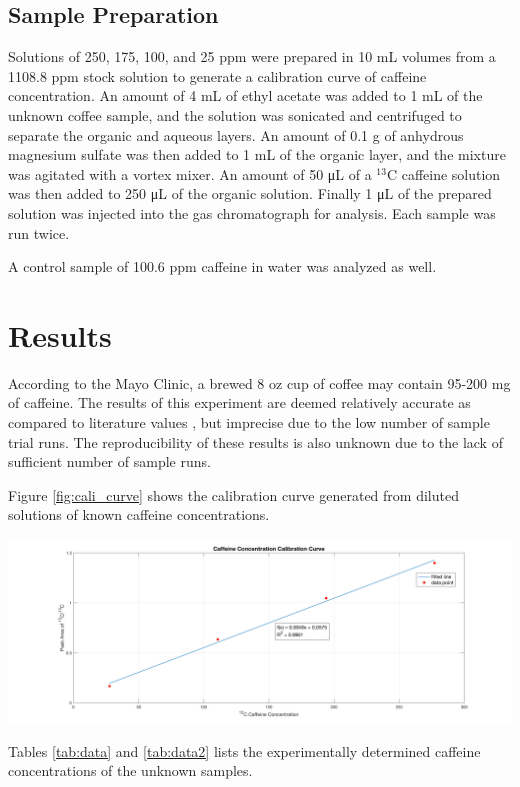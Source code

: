 \documentclass{article}
\begin{document}
\begin{multicols}{2}
{\subsection*{Sample Preparation}
Solutions of 250, 175, 100, and 25 ppm were prepared in 10 mL volumes
from a 1108.8 ppm stock solution to generate a calibration curve of caffeine
concentration. 
An amount of 4 mL of ethyl acetate was added to 1 mL of the unknown coffee
sample, and the solution was sonicated and centrifuged to separate the organic 
and aqueous layers.  
An amount of 0.1 g of anhydrous magnesium sulfate was then added to 1 mL of the
organic layer, and the mixture was agitated with a vortex mixer.  An amount of
50 μL of a $^{13}$C caffeine solution was then added to 250 μL of the organic
solution. 
Finally 1 μL of the prepared solution was injected into the gas chromatograph
for analysis. Each sample was run twice.

A control sample of 100.6 ppm caffeine in water was analyzed as well.
\cite{lab_man}

\section*{Results}
According to the Mayo Clinic, a brewed 8 oz cup of coffee may contain 95-200 mg
of caffeine.
The results of this experiment are deemed relatively accurate as compared to
literature values \cite{mayo}, but imprecise due to the low number of sample
trial runs. The reproducibility of these results is also unknown due to the lack
of sufficient number of sample runs.

Figure \ref{fig:cali_curve} shows the calibration curve generated from diluted
solutions of known caffeine concentrations.
\begin{center}
    \includegraphics[scale=0.1]{calibration_curve}
    \label{fig:cali_curve}
\end{center}

Tables \ref{tab:data} and \ref{tab:data2} lists the experimentally determined
caffeine concentrations of the unknown samples. 

}
\end{multicols}
\end{document}
